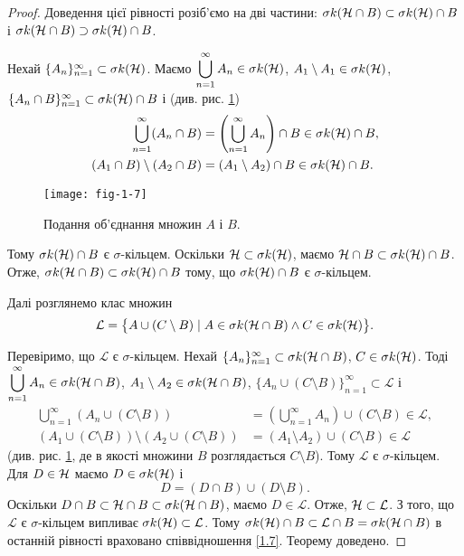 \begin{proof}
	Доведення цієї рівності розіб'ємо на дві частини: $\sigma k(\mathcal H\cap B)\subset\sigma k(\mathcal H)\cap B$ і $\sigma k(\mathcal H\cap B)\supset\sigma k(\mathcal H)\cap B$.
	
	Нехай $\{A_n\}_{n=1}^\infty\subset \sigma k(\mathcal H)$. Маємо  $\displaystyle \bigcup_{n=1}^\infty A_n\in \sigma k(\mathcal H)$, $A_1\setminus A_1\in \sigma k(\mathcal H)$, $\{A_n\cap B\}_{n=1}^\infty\subset \sigma k(\mathcal H)\cap B$ і (див. рис. \ref{fig-1-7})
	\begin{align*}
	\bigcup_{n=1}^\infty (A_n\cap B)& = \left(\bigcup_{n=1}^\infty A_n\right)\cap B \in \sigma k(\mathcal H)\cap B,
	\\
	(A_1\cap B)\setminus (A_2\cap B)&= (A_1\setminus A_2) \cap B\in \sigma k(\mathcal H)\cap B.
	\end{align*}
	\begin{figure}[!h]
		\centering
		\texttt{[image: fig-1-7]}
		\caption{Подання об'єднання множин $A$ і $B$.}
		\label{fig-1-7}
	\end{figure}
	Тому $\sigma k(\mathcal H)\cap B$ є $\sigma$-кільцем. Оскільки $\mathcal H\subset \sigma k(\mathcal H)$, маємо $\mathcal H\cap B \subset \sigma k(\mathcal H)\cap B$. Отже, $\sigma k(\mathcal H\cap B)\subset\sigma k(\mathcal H)\cap B$ тому, що $\sigma k(\mathcal H)\cap B$ є $\sigma$-кільцем.
	
	Далі розглянемо клас множин
	\begin{equation}
	\label{1.7}
	\mathcal L= \big\{A\cup(C\setminus B) \mid A\in \sigma k(\mathcal H\cap B) \land C\in \sigma k(\mathcal H)\big\}.
	\end{equation}
	
	Перевіримо, що $\mathcal L$ є $\sigma$-кільцем. Нехай $\{A_n\}_{n=1}^\infty\subset \sigma k(\mathcal H\cap B)$, $C\in \sigma k(\mathcal H)$. Тоді $\displaystyle \bigcup_{n=1}^\infty A_n\in \sigma k(\mathcal H\cap B)$, $A_1\setminus A_2\in \sigma k(\mathcal H\cap B)$, $\{A_n\cup(C\setminus B)\}_{n=1}^\infty\subset \mathcal L$ і
	\begin{align*}
	\bigcup_{n=1}^\infty (A_n\cup(C\setminus B))& = \left(\bigcup_{n=1}^\infty A_n\right)\cup(C\setminus B) \in \mathcal L,
	\\
	(A_1\cup(C\setminus B))\setminus (A_2\cup(C\setminus B))&= (A_1\setminus A_2) \cup(C\setminus B)\in \mathcal L
	\end{align*}
	(див. рис. \ref{fig-1-7}, де в якості множини $B$  розглядається $C\setminus B$).
	Тому $\mathcal L$ є $\sigma$-кільцем. Для $D\in\mathcal H$ маємо $D\in \sigma k(\mathcal H)$ і
	$$
	D=(D\cap B)\cup (D\setminus B).
	$$
	Оскільки $D\cap B\subset \mathcal H\cap B\subset \sigma k(\mathcal H\cap B)$, маємо $D\in\mathcal L$. Отже, $\mathcal H\subset \mathcal L$. З того, що $\mathcal L$ є $\sigma$-кільцем випливає $\sigma k(\mathcal H)\subset \mathcal L$. Тому $\sigma k(\mathcal H)\cap B\subset \mathcal L\cap B=\sigma k(\mathcal H\cap B)$ в останній рівності враховано співвідношення \eqref{1.7}. Теорему доведено. 
\end{proof}

